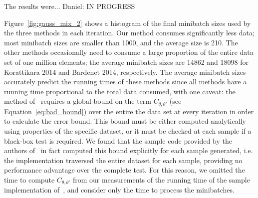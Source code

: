 \documentclass{article}
\begin{document}
The results were... {\color{blue} Daniel: IN PROGRESS}

Figure~\ref{fig:gauss_mix_2} shows a histogram of the final minibatch sizes used
by the three methods in each iteration. Our method consumes significantly less
data; most minibatch sizes are smaller than 1000, and the average size is 210.
The other methods occasionally need to consume a large proportion of the
entire data set of one million elements; the average minibatch sizes are 14862
and 18098 for Korattikara 2014 and Bardenet 2014, respectively. The average
minibatch sizes accurately predict the running times of these methods since
all methods have a running time proportional to the total data consumed, with
one caveat: the method of~\cite{icml2014c1_bardenet14} requires a global bound
on the term $C_{\theta,\theta'}$ (see Equation~\ref{eq:bad_bound}) over the
entire the data set at every iteration in order to calculate the error bound.
This bound must be either computed analytically using properties of the specific
dataset, or it must be checked at each sample if a black-box test is required.
We found that the sample code provided by the authors
of~\cite{icml2014c1_bardenet14} in fact computed this bound explicitly for each
sample generated, i.e. the implementation traversed the entire dataset for each
sample, providing no performance advantage over the complete test. For this
reason, we omitted the time to compute $C_{\theta,\theta'}$ from our
measurements of the running time of the sample implementation
of~\cite{icml2014c1_bardenet14}, and consider only the time to process the
minibatches.


\end{document}
